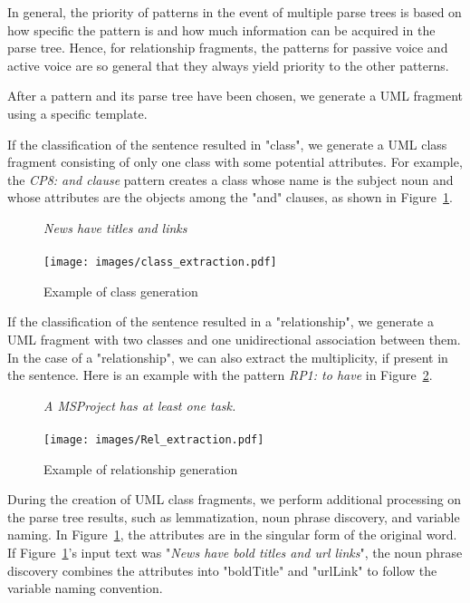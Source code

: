 \documentclass[sigconf]{acmart}
\begin{document}
In general, the priority of patterns in the event of multiple parse trees is based on how specific the pattern is and how much information can be acquired in the parse tree. Hence, for relationship fragments, the patterns for passive voice and active voice are so general that they always yield priority to the other patterns.

After a pattern and its parse tree have been chosen, we generate a UML fragment using a specific template.

If the classification of the sentence resulted in "class", we generate a  UML class fragment consisting of only one class with some potential attributes. For example, the \textit{CP8: and clause} pattern creates a class whose name is the subject noun and whose attributes are the objects among the "and" clauses, as shown in Figure~\ref{fig:class_generation}.

\begin{figure}[h]
    \centering
    \textit{News have titles and links} \\
     \\
    \texttt{[image: images/class\_extraction.pdf]}
    \caption{Example of class generation}
    \label{fig:class_generation}
\end{figure}

If the classification of the sentence resulted in a  "relationship", we generate a UML fragment with two classes and one unidirectional association between them. In the case of a "relationship", we can also extract the multiplicity, if present in the sentence. Here is an example with the pattern \textit{RP1: to have} in Figure~\ref{fig:relation_generation}.

\begin{figure}[h]
    \centering
    \textit{A MSProject has at least one task.} \\
     \\
    \texttt{[image: images/Rel\_extraction.pdf]}
    \caption{Example of relationship generation}
    \label{fig:relation_generation}
\end{figure}

During the creation of UML class fragments, we perform additional processing on the parse tree results, such as lemmatization, noun phrase discovery, and variable naming. In Figure~\ref{fig:class_generation}, the attributes are in the singular form of the original word. If Figure~\ref{fig:class_generation}'s input text was "\textit{News have bold titles and url links}", the noun phrase discovery combines the attributes into "boldTitle" and "urlLink" to follow the variable naming convention.
\end{document}
